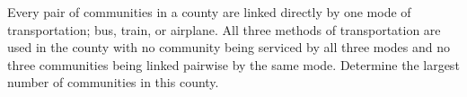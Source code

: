 Every pair of communities in a county are linked directly by one mode of transportation; bus, train, or airplane. All three methods of transportation are used in the county with no community being serviced by all three modes and no three communities being linked pairwise by the same mode. Determine the largest number of communities in this county.